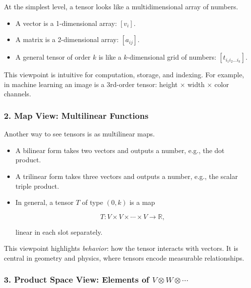 \documentclass[
  letterpaper,
  DIV=11,
  numbers=noendperiod]{scrreprt}
\providecommand{\tightlist}{%
  \setlength{\itemsep}{0pt}\setlength{\parskip}{0pt}}
\begin{document}
At the simplest level, a tensor looks like a multidimensional array of
numbers.

\begin{itemize}
\tightlist
\item
  A vector is a 1-dimensional array: \([v_i]\).
\item
  A matrix is a 2-dimensional array: \([a_{ij}]\).
\item
  A general tensor of order \(k\) is like a \(k\)-dimensional grid of
  numbers: \([t_{i_1 i_2 \dots i_k}]\).
\end{itemize}

This viewpoint is intuitive for computation, storage, and indexing. For
example, in machine learning an image is a 3rd-order tensor: height ×
width × color channels.

\subsubsection{2. Map View: Multilinear
Functions}\label{map-view-multilinear-functions}

Another way to see tensors is as multilinear maps.

\begin{itemize}
\item
  A bilinear form takes two vectors and outputs a number, e.g., the dot
  product.
\item
  A trilinear form takes three vectors and outputs a number, e.g., the
  scalar triple product.
\item
  In general, a tensor \(T\) of type \((0,k)\) is a map

  \[
  T: V \times V \times \cdots \times V \to \mathbb{R},
  \]

  linear in each slot separately.
\end{itemize}

This viewpoint highlights \emph{behavior}: how the tensor interacts with
vectors. It is central in geometry and physics, where tensors encode
measurable relationships.

\subsubsection{\texorpdfstring{3. Product Space View: Elements of
\(V \otimes W \otimes \cdots\)}{3. Product Space View: Elements of V \textbackslash otimes W \textbackslash otimes \textbackslash cdots}}\label{product-space-view-elements-of-v-otimes-w-otimes-cdots}
\end{document}
